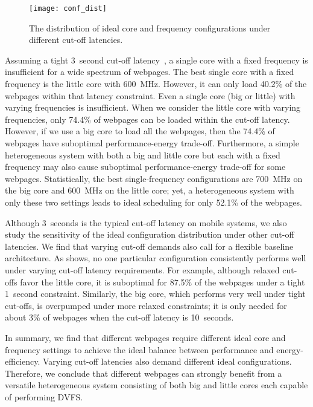 \begin{figure}[t]
\centering
\texttt{[image: conf\_dist]}
\caption{The distribution of ideal core and frequency configurations under different cut-off latencies.}
\label{fig:conf-dist}
\end{figure}

Assuming a tight 3~second cut-off latency~\cite{ThreeSecond}, a single core with a fixed frequency is insufficient for a wide spectrum of webpages.  The best single core with a fixed frequency is the little core with 600~MHz.  However, it can only load 40.2\% of the webpages within that latency constraint. Even a single core (big or little) with varying frequencies is insufficient. When we consider the little core with varying frequencies, only 74.4\% of webpages can be loaded within the cut-off latency. However, if we use a big core to load all the webpages, then the 74.4\% of webpages have suboptimal performance-energy trade-off. Furthermore, a simple heterogeneous system with both a big and little core but each with a fixed frequency may also cause suboptimal performance-energy trade-off for some webpages. Statistically, the best single-frequency configurations are 700~MHz on the big core and 600~MHz on the little core; yet, a heterogeneous system with only these two settings leads to ideal scheduling for only 52.1\% of the webpages.

Although 3~seconds is the typical cut-off latency on mobile systems, we also study the sensitivity of the ideal configuration distribution under other cut-off latencies. We find that varying cut-off demands also call for a flexible baseline architecture. As  shows, no one particular configuration consistently performs well under varying cut-off latency requirements. For example, although relaxed cut-offs favor the little core, it is suboptimal for 87.5\% of the webpages under a tight 1~second constraint. Similarly, the big core, which performs very well under tight cut-offs, is overpumped under more relaxed constraints; it is only needed for about 3\% of webpages when the cut-off latency is 10~seconds.

In summary, we find that different webpages require different ideal core and frequency settings to achieve the ideal balance between performance and energy-efficiency. Varying cut-off latencies also demand different ideal configurations. Therefore, we conclude that different webpages can strongly benefit from a versatile heterogeneous system consisting of both big and little cores each capable of performing DVFS.

